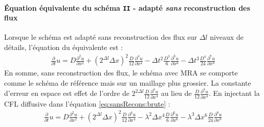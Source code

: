 \paragraph{Équation équivalente du schéma \texttt{II} - adapté \emph{sans} reconstruction des flux}
    Lorsque le schéma est adapté sans reconstruction des flux sur $\Delta l$ niveaux de détails,
    l'équation du équivalente est :
    \begin{align}\label{eq:sansRecons:brute}
        \frac{\partial}{\partial t} u=
            D \frac{\partial^{2}u}{\partial x^{2}}
            + (2^{\Delta l} \Delta x)^{2}  \frac{D}{12} \frac{\partial^{4}u}{\partial x^{4}}
            -\Delta t^{2} \frac{D^{3}}{6}   \frac{\partial^{6}u}{\partial x^{6}}
            -\Delta t^{3} \frac{D^{4} }{24} \frac{\partial^{8}u}{\partial x^{8}}
    \end{align}
    En somme, sans reconstruction des flux, le schéma avec MRA se comporte comme le schéma de référence mais sur un maillage plus grossier. 
    La constante d'erreur en espace est effet de l'ordre de $2^{2\Delta l} \frac{D}{12} \frac{\partial^{4}u}{\partial x^{4}}$ 
    au lieu de $\frac{D}{12}\frac{\partial^{4}u}{\partial x^{4}}$.
    En injectant la CFL diffusive dans l'équation \eqref{eq:sansRecons:brute} :
    \begin{align}\label{eq:sansRecons:cfl}
        \frac{\partial}{\partial t} u=
            D \frac{\partial^{2}u}{\partial x^{2}}
            + (2^{\Delta l} \Delta x)^{2}  \frac{D}{12} \frac{\partial^{4}u}{\partial x^{4}}
            -\lambda^2 \Delta x^{4} \frac{D}{6}   \frac{\partial^{6}u}{\partial x^{6}}
            -\lambda^3 \Delta x^{6} \frac{D}{24} \frac{\partial^{8}u}{\partial x^{8}}
    \end{align}
